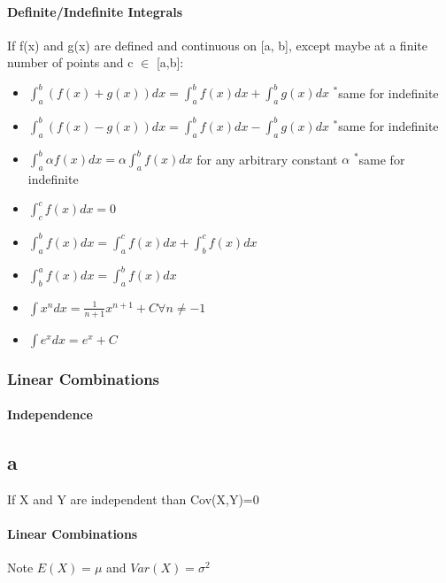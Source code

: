 \documentclass[12pt]{article}
\begin{document}
\subsection{Definite/Indefinite Integrals}
If f(x) and g(x) are defined and continuous on [a, b], except maybe at a finite number of points and c $\in$ [a,b]:
\begin{itemize}
\item $\int_{a}^{b} (f(x)+g(x))dx = \int_{a}^{b} f(x)dx + \int_{a}^{b} g(x)dx$ $^*$same for indefinite
\item $\int_{a}^{b} (f(x)-g(x))dx = \int_{a}^{b} f(x)dx - \int_{a}^{b} g(x)dx$ $^*$same for indefinite
\item $\int_{a}^{b} \alpha f(x)dx=\alpha\int_{a}^{b} f(x)dx$ for any arbitrary constant $\alpha$ $^*$same for indefinite
\item $\int_{c}^{c} f(x)dx=0$
\item $\int_{a}^{b} f(x)dx =  \int_{a}^{c} f(x)dx + \int_{b}^{c} f(x)dx$
\item $\int_{b}^{a} f(x)dx = \int_{a}^{b} f(x)dx$
\item $\int x^n dx = \frac{1}{n+1} x^{n+1} + C  \forall n \neq -1$
\item $\int e^x dx = e^x + C$
\end{itemize}
\section{Linear Combinations}
\subsection{Independence}
\begin{itemize}
\part{a} If X and Y are independent than Cov(X,Y)=0
\end{itemize}

\subsection{Linear Combinations}
Note $E(X)= \mu$ and $Var(X)= \sigma^2$
\end{document}
